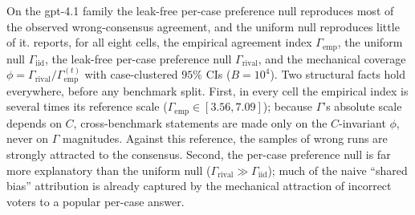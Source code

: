 \documentclass{article}
\newcommand{\agreementIndex}{\Gamma}
\begin{document}
On the gpt-4.1 family the leak-free per-case preference null
reproduces most of the observed wrong-consensus agreement, and the
uniform null reproduces little of it.  reports, for all
eight cells, the empirical agreement
index $\agreementIndex_{\mathrm{emp}}$, the uniform null $\agreementIndex_{\mathrm{iid}}$,
the leak-free per-case preference null $\agreementIndex_{\mathrm{rival}}$, and the
mechanical coverage $\phi=\agreementIndex_{\mathrm{rival}}/\agreementIndex_{\mathrm{emp}}^{(t)}$ with case-clustered $95\%$ CIs ($B=10^4$). Two structural facts
hold everywhere, before any benchmark split. First, in every cell the
empirical index is several times its reference scale
($\agreementIndex_{\mathrm{emp}}\in[3.56,7.09]$); because $\agreementIndex$'s absolute scale
depends on $C$, cross-benchmark statements are made only on the
$C$-invariant $\phi$, never on $\agreementIndex$ magnitudes. Against this reference,
the samples of wrong runs are strongly attracted
to the consensus. Second, the per-case preference null is far more
explanatory than the uniform null ($\agreementIndex_{\mathrm{rival}}\gg
\agreementIndex_{\mathrm{iid}}$); much of the naive ``shared
bias'' attribution is already captured by the mechanical attraction of
incorrect voters to a popular per-case answer.
\end{document}
